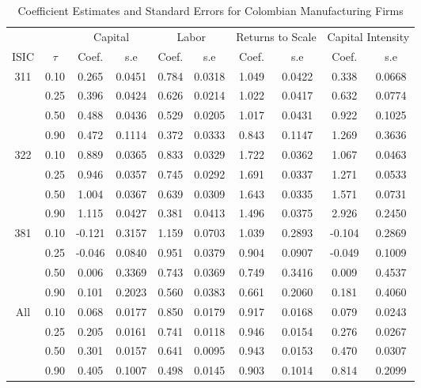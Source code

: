 \begin{table}[ht]
\centering
\caption{Coefficient Estimates and Standard Errors for Colombian Manufacturing Firms} 
\begin{tabular}{cccccccccc}
  \hline\hline & & \multicolumn{2}{c}{Capital}  & \multicolumn{2}{c}{Labor} & \multicolumn{2}{c}{Returns to Scale} & \multicolumn{2}{c}{Capital Intensity}\\ \cmidrule(lr){3-4} \cmidrule(lr){5-6} \cmidrule(lr){7-8} \cmidrule(lr){9-10}ISIC & $\tau$ & Coef. & s.e & Coef. & s.e & Coef. & s.e & Coef. & s.e \\ 
  \hline
311 & 0.10 & 0.265 & 0.0451 & 0.784 & 0.0318 & 1.049 & 0.0422 & 0.338 & 0.0668 \\ 
   & 0.25 & 0.396 & 0.0424 & 0.626 & 0.0214 & 1.022 & 0.0417 & 0.632 & 0.0774 \\ 
   & 0.50 & 0.488 & 0.0436 & 0.529 & 0.0205 & 1.017 & 0.0431 & 0.922 & 0.1025 \\ 
   & 0.90 & 0.472 & 0.1114 & 0.372 & 0.0333 & 0.843 & 0.1147 & 1.269 & 0.3636 \\ 
  322 & 0.10 & 0.889 & 0.0365 & 0.833 & 0.0329 & 1.722 & 0.0362 & 1.067 & 0.0463 \\ 
   & 0.25 & 0.946 & 0.0357 & 0.745 & 0.0292 & 1.691 & 0.0337 & 1.271 & 0.0533 \\ 
   & 0.50 & 1.004 & 0.0367 & 0.639 & 0.0309 & 1.643 & 0.0335 & 1.571 & 0.0731 \\ 
   & 0.90 & 1.115 & 0.0427 & 0.381 & 0.0413 & 1.496 & 0.0375 & 2.926 & 0.2450 \\ 
  381 & 0.10 & -0.121 & 0.3157 & 1.159 & 0.0703 & 1.039 & 0.2893 & -0.104 & 0.2869 \\ 
   & 0.25 & -0.046 & 0.0840 & 0.951 & 0.0379 & 0.904 & 0.0907 & -0.049 & 0.1009 \\ 
   & 0.50 & 0.006 & 0.3369 & 0.743 & 0.0369 & 0.749 & 0.3416 & 0.009 & 0.4537 \\ 
   & 0.90 & 0.101 & 0.2023 & 0.560 & 0.0383 & 0.661 & 0.2060 & 0.181 & 0.4060 \\ 
  All & 0.10 & 0.068 & 0.0177 & 0.850 & 0.0179 & 0.917 & 0.0168 & 0.079 & 0.0243 \\ 
   & 0.25 & 0.205 & 0.0161 & 0.741 & 0.0118 & 0.946 & 0.0154 & 0.276 & 0.0267 \\ 
   & 0.50 & 0.301 & 0.0157 & 0.641 & 0.0095 & 0.943 & 0.0153 & 0.470 & 0.0307 \\ 
   & 0.90 & 0.405 & 0.1007 & 0.498 & 0.0145 & 0.903 & 0.1014 & 0.814 & 0.2099 \\ 
   \hline
\end{tabular}
\end{table}
